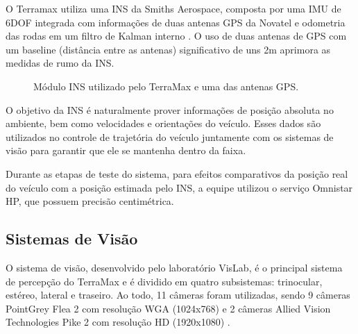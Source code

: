 O Terramax utiliza uma INS da Smiths Aerospace, composta por uma IMU de 6DOF integrada com informações de duas antenas GPS da Novatel e odometria das rodas em um filtro de Kalman interno . O uso de duas antenas de GPS com um baseline (distância entre as antenas) significativo de uns 2m aprimora as medidas de rumo da INS.

\begin{figure}[h]
\centering
{}\qquad
{}
\caption{Módulo INS utilizado pelo TerraMax e uma das antenas GPS.}%
\label{fig:INS}%
\end{figure}

O objetivo da INS é naturalmente prover informações de posição absoluta no ambiente, bem como velocidades e orientações do veículo. Esses dados são utilizados no controle de trajetória do veículo juntamente com os sistemas de visão para garantir que ele se mantenha dentro da faixa.

Durante as etapas de teste do sistema, para efeitos comparativos da posição real do veículo com a posição estimada pelo INS, a equipe utilizou o serviço Omnistar HP, que possuem precisão centimétrica.

\subsection{Sistemas de Visão}

O sistema de visão, desenvolvido pelo laboratório VisLab, é o principal sistema de percepção do TerraMax e é dividido em quatro subsistemas: trinocular, estéreo, lateral e traseiro. Ao todo, 11 câmeras foram utilizadas, sendo 9 câmeras PointGrey
Flea 2 com resolução WGA (1024x768) e 2 câmeras Allied Vision Technologies Pike 2 com resolução HD (1920x1080) .

